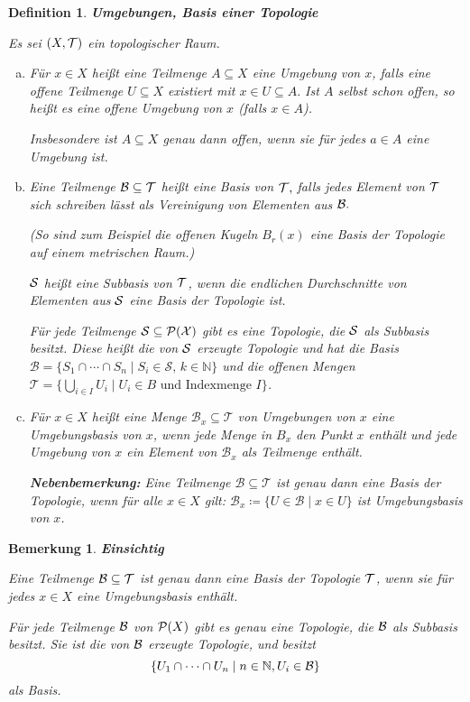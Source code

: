\documentclass[12pt]{scrbook}   %
\newtheorem{bemX}[alles]{Bemerkung}
\newenvironment{bem}[1]{\begin{bemX}{\bf #1}\par\rm}{\end{bemX}}
\newtheorem{definiX}[alles]{Definition}
\newenvironment{defini}[1]{\begin{definiX}{\bf #1}\par\rm}{\end{definiX}}
\newcommand{\da}{\coloneqq}
\begin{document}
\begin{defini}{Umgebungen, Basis einer Topologie}
Es sei $(X,{\cal T})$ ein topologischer Raum.
\begin{enumerate}[a)]
\item Für $x\in X$ heißt eine Teilmenge $A\subseteq X$ eine 
{\it Umgebung} von $x$, falls eine offene Teilmenge 
$U\subseteq X$ existiert mit $x\in U\subseteq A.$ Ist $A$ selbst schon offen, 
so heißt es eine {\it offene Umgebung} von $x$ (falls $x\in A$).

Insbesondere ist $A\subseteq X$ genau dann offen, wenn sie für jedes $a\in A$ eine Umgebung ist.

\item Eine Teilmenge ${\cal B}\subseteq {\cal T}$ heißt eine {\it Basis}
von ${\cal T},$ falls jedes Element von $\cal T$ sich schreiben lässt als
Vereinigung von Elementen aus ${\cal B}.$

(So sind zum Beispiel die offenen Kugeln $B_r(x)$ eine Basis der Topologie auf 
einem metrischen Raum.)

$\cal S$ heißt eine {\it Subbasis} von $\cal T$, wenn die endlichen Durchschnitte von Elementen aus ${\cal S}$ eine Basis der Topologie ist.

Für jede Teilmenge $\cal S \subseteq \cal P(X)$ gibt es eine Topologie, die $\cal S$ als Subbasis besitzt. Diese heißt die von $\cal S$ erzeugte Topologie und hat die Basis $\mathcal B = \{S_1\cap\cdots\cap S_n \mid S_i \in \mathcal S,\, k\in \mathbb N\}$ und die offenen Mengen $\mathcal T = \{ \bigcup_{i\in I} U_i \mid U_i \in B \text{ und Indexmenge } I\}$.

\item Für $x\in X$ heißt eine Menge $\mathcal B_x\subseteq \mathcal T$ von Umgebungen von $x$ 
eine {\it Umgebungsbasis} von $x$, wenn jede Menge in $B_x$ den Punkt $x$ enthält und jede Umgebung von $x$ ein Element von $\mathcal B_x$ als Teilmenge enthält.

{\bf Nebenbemerkung:} Eine Teilmenge $\mathcal B \subseteq \mathcal T$ ist genau dann eine Basis der Topologie, wenn für alle $x\in X$ gilt: $\mathcal B_x \da \{ U\in \mathcal B \mid x\in U\}$ ist Umgebungsbasis von $x$.
\end{enumerate}
\end{defini}

\begin{bem}{Einsichtig}
Eine Teilmenge ${\cal B }\subseteq {\cal T}$ ist genau dann eine Basis 
der Topologie $\cal T$, wenn sie für jedes $x\in X$ eine Umgebungsbasis 
enthält.

Für jede Teilmenge $\cal B$ von ${\cal P}(X)$ gibt es genau eine Topologie,
die $\cal B$ als Subbasis besitzt. Sie ist die {\it von ${\cal B}$ erzeugte } 
Topologie, und besitzt 
$$\{U_1\cap \dots \cap U_n \mid n\in\mathbb N, U_i\in {\cal B}\}$$
als Basis.
\end{bem}
\end{document}
